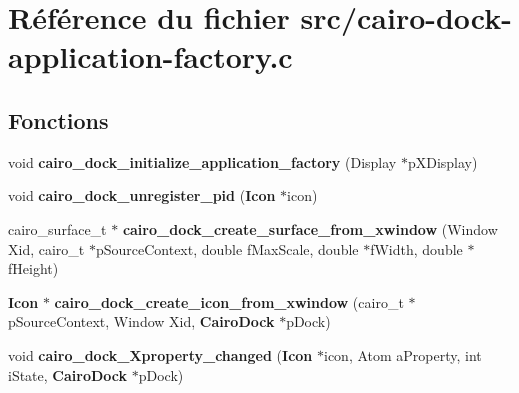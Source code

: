 \section{R\'{e}f\'{e}rence du fichier src/cairo-dock-application-factory.c}
\label{cairo-dock-application-factory_8c}
\subsection*{Fonctions}
\begin{CompactItemize}
\item 
void {\bf cairo\_\-dock\_\-initialize\_\-application\_\-factory} (Display $\ast$p\-XDisplay)
\item 
void {\bf cairo\_\-dock\_\-unregister\_\-pid} ({\bf Icon} $\ast$icon)
\item 
cairo\_\-surface\_\-t $\ast$ {\bf cairo\_\-dock\_\-create\_\-surface\_\-from\_\-xwindow} (Window Xid, cairo\_\-t $\ast$p\-Source\-Context, double f\-Max\-Scale, double $\ast$f\-Width, double $\ast$f\-Height)
\item 
{\bf Icon} $\ast$ {\bf cairo\_\-dock\_\-create\_\-icon\_\-from\_\-xwindow} (cairo\_\-t $\ast$p\-Source\-Context, Window Xid, {\bf Cairo\-Dock} $\ast$p\-Dock)
\item 
void {\bf cairo\_\-dock\_\-Xproperty\_\-changed} ({\bf Icon} $\ast$icon, Atom a\-Property, int i\-State, {\bf Cairo\-Dock} $\ast$p\-Dock)
\end{CompactItemize}
